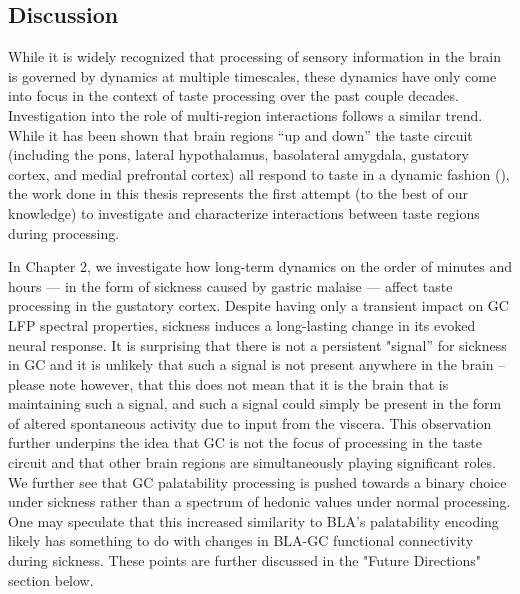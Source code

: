 \begin{refsection}

\chapter{Discussion}

While it is widely recognized that processing of sensory information in the brain is governed by dynamics at multiple timescales, these dynamics have only come into focus in the context of taste processing over the past couple decades. Investigation into the role of multi-region interactions follows a similar trend. While it has been shown that brain regions “up and down” the taste circuit (including the pons, lateral hypothalamus, basolateral amygdala, gustatory cortex, and medial prefrontal cortex) all respond to taste in a dynamic fashion (\cite{katz2001a,fontanini2009a,jezzini2013a,li2013a,baez-santiago2016a}), the work done in this thesis represents the first attempt (to the best of our knowledge) to investigate and characterize interactions between taste regions during processing.

In Chapter 2, we investigate how long-term dynamics on the order of minutes and hours --- in the form of sickness caused by gastric malaise --- affect taste processing in the gustatory cortex. Despite having only a transient impact on GC LFP spectral properties, sickness induces a long-lasting change in its evoked neural response. It is surprising that there is not a persistent "signal” for sickness in GC and it is unlikely that such a signal is not present anywhere in the brain – please note however, that this does not mean that it is the brain that is maintaining such a signal, and such a signal could simply be present in the form of altered spontaneous activity due to input from the viscera. This observation further underpins the idea that GC is not the focus of processing in the taste circuit and that other brain regions are simultaneously playing significant roles. We further see that GC palatability processing is pushed towards a binary choice under sickness rather than a spectrum of hedonic values under normal processing. One may speculate that this increased similarity to BLA’s palatability encoding likely has something to do with changes in BLA-GC functional connectivity during sickness. These points are further discussed in the "Future Directions" section below.


\end{refsection}
